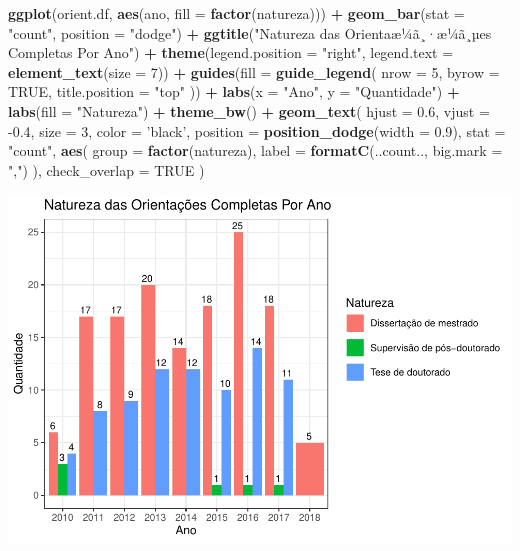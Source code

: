 \documentclass[]{article}
\newenvironment{Shaded}{\begin{snugshade}}{\end{snugshade}}
\newcommand{\DataTypeTok}[1]{\textcolor[rgb]{0.13,0.29,0.53}{#1}}
\newcommand{\DecValTok}[1]{\textcolor[rgb]{0.00,0.00,0.81}{#1}}
\newcommand{\FloatTok}[1]{\textcolor[rgb]{0.00,0.00,0.81}{#1}}
\newcommand{\KeywordTok}[1]{\textcolor[rgb]{0.13,0.29,0.53}{\textbf{#1}}}
\newcommand{\NormalTok}[1]{#1}
\newcommand{\OperatorTok}[1]{\textcolor[rgb]{0.81,0.36,0.00}{\textbf{#1}}}
\newcommand{\OtherTok}[1]{\textcolor[rgb]{0.56,0.35,0.01}{#1}}
\newcommand{\StringTok}[1]{\textcolor[rgb]{0.31,0.60,0.02}{#1}}
\begin{document}
\begin{Shaded}
\begin{Highlighting}[]
\KeywordTok{ggplot}\NormalTok{(orient.df, }\KeywordTok{aes}\NormalTok{(ano, }\DataTypeTok{fill =} \KeywordTok{factor}\NormalTok{(natureza))) }\OperatorTok{+}
\StringTok{  }\KeywordTok{geom_bar}\NormalTok{(}\DataTypeTok{stat =} \StringTok{"count"}\NormalTok{, }\DataTypeTok{position =} \StringTok{"dodge"}\NormalTok{) }\OperatorTok{+}
\StringTok{  }\KeywordTok{ggtitle}\NormalTok{(}\StringTok{"Natureza das Orientaæ¼ã¸·æ¼ã¸µes Completas Por Ano"}\NormalTok{) }\OperatorTok{+}
\StringTok{  }\KeywordTok{theme}\NormalTok{(}\DataTypeTok{legend.position =} \StringTok{"right"}\NormalTok{, }\DataTypeTok{legend.text =} \KeywordTok{element_text}\NormalTok{(}\DataTypeTok{size =} \DecValTok{7}\NormalTok{)) }\OperatorTok{+}
\StringTok{  }\KeywordTok{guides}\NormalTok{(}\DataTypeTok{fill =} \KeywordTok{guide_legend}\NormalTok{(}
    \DataTypeTok{nrow =} \DecValTok{5}\NormalTok{,}
    \DataTypeTok{byrow =} \OtherTok{TRUE}\NormalTok{,}
    \DataTypeTok{title.position =} \StringTok{"top"}
\NormalTok{  )) }\OperatorTok{+}
\StringTok{  }\KeywordTok{labs}\NormalTok{(}\DataTypeTok{x =} \StringTok{"Ano"}\NormalTok{, }\DataTypeTok{y =} \StringTok{"Quantidade"}\NormalTok{) }\OperatorTok{+}\StringTok{ }\KeywordTok{labs}\NormalTok{(}\DataTypeTok{fill =} \StringTok{"Natureza"}\NormalTok{) }\OperatorTok{+}\StringTok{ }\KeywordTok{theme_bw}\NormalTok{() }\OperatorTok{+}
\StringTok{  }\KeywordTok{geom_text}\NormalTok{(}
    \DataTypeTok{hjust =} \FloatTok{0.6}\NormalTok{,}
    \DataTypeTok{vjust =} \FloatTok{-0.4}\NormalTok{,}
    \DataTypeTok{size =} \DecValTok{3}\NormalTok{,}
    \DataTypeTok{color =} \StringTok{'black'}\NormalTok{,}
    \DataTypeTok{position =} \KeywordTok{position_dodge}\NormalTok{(}\DataTypeTok{width =} \FloatTok{0.9}\NormalTok{),}
    \DataTypeTok{stat =} \StringTok{"count"}\NormalTok{,}
    \KeywordTok{aes}\NormalTok{(}
      \DataTypeTok{group =} \KeywordTok{factor}\NormalTok{(natureza),}
      \DataTypeTok{label =} \KeywordTok{formatC}\NormalTok{(..count.., }\DataTypeTok{big.mark =} \StringTok{","}\NormalTok{)}
\NormalTok{    ),}
    \DataTypeTok{check_overlap =} \OtherTok{TRUE}
\NormalTok{  )}
\end{Highlighting}
\end{Shaded}

\includegraphics{LuanFreitas.relatorio2_files/figure-latex/unnamed-chunk-92-1.pdf}
\end{document}
